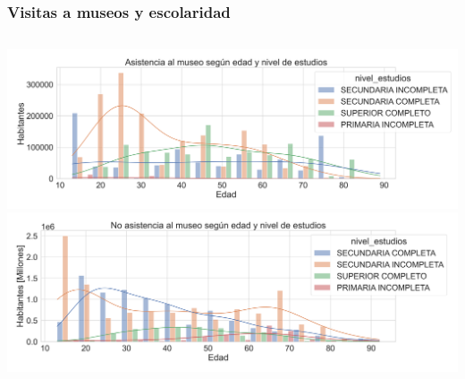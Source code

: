 \documentclass[10pt]{beamer}
\begin{document}
\begin{frame}
  \frametitle{Visitas a museos y escolaridad}

    \begin{columns}
        \includegraphics[width=\textwidth]{dist_asistentes.png}
        \vfill
        \includegraphics[width=\textwidth]{dist_no_asistentes.png}


\end{columns}
\end{frame}
\end{document}
